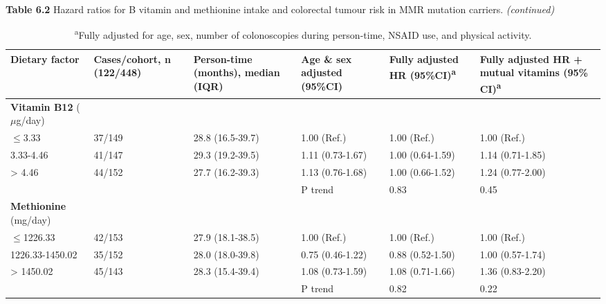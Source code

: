 \begin{sidewaystable}
\caption*{\textbf{Table 6.2} Hazard ratios for B vitamin and methionine intake and colorectal tumour risk in MMR mutation carriers. \emph{(continued)}}
\begin{adjustbox}{width=\textwidth}
\begin{tabular}{L{2.7cm}C{2.5cm}C{3.1cm}C{3.1cm}C{3.1cm}C{3.1cm}}
\hline
\parbox[c][1.7cm]{2.7cm}{\centering \textbf{Dietary factor}} &
\parbox[c][1.7cm]{2.5cm}{\centering \textbf{Cases/cohort, n (122/448)}} &
\parbox[c][1.7cm]{3.1cm}{\centering \textbf{Person-time (months), median (IQR)}} &
\parbox[c][1.7cm]{3.1cm}{\centering \textbf{Age \& sex adjusted (95\%CI)}} &
\parbox[c][1.7cm]{3.1cm}{\centering \textbf{Fully adjusted HR (95\%CI)}{\textsuperscript{a}}} &
\parbox[c][1.7cm]{3.1cm}{\centering \textbf{Fully adjusted HR + mutual vitamins (95\% CI)}{\textsuperscript{a}}}\\
\hline
{\textbf{Vitamin B12}}{ ($\mu$g/day)} & ~ & ~ & ~ & ~ & ~ \\
{\textrm{${\leq}$}}{3.33} & 37/149 & 28.8 (16.5-39.7) & 1.00 (Ref.) & 1.00 (Ref.) & 1.00 (Ref.)\\
3.33-4.46 & 41/147 & 29.3 (19.2-39.5) & 1.11 (0.73-1.67) & 1.00 (0.64-1.59) & 1.14 (0.71-1.85)\\
{\textgreater} 4.46 & 44/152 & 27.7 (16.2-39.3) & 1.13 (0.76-1.68) & 1.00 (0.66-1.52) & 1.24 (0.77-2.00)\\ ~ & ~ & ~ & P trend & 0.83 & 0.45\\

{\textbf{Methionine}}{ (mg/day)} & ~ & ~ & ~ & ~ & ~ \\
{\textrm{${\leq}$}}{1226.33} & 42/153 & 27.9 (18.1-38.5) & 1.00 (Ref.) & 1.00 (Ref.) & 1.00 (Ref.)\\
1226.33-1450.02 & 35/152 & 28.0 (18.0-39.8) & 0.75 (0.46-1.22) & 0.88 (0.52-1.50) & 1.00 (0.57-1.74)\\
{\textgreater} 1450.02 & 45/143 & 28.3 (15.4-39.4) & 1.08 (0.73-1.59) & 1.08 (0.71-1.66) & 1.36 (0.83-2.20)\\ ~ & ~ & ~ & P trend & 0.82 & 0.22\\
\hline
\end{tabular}
\end{adjustbox}
\caption*{\footnotesize{\textsuperscript{a}Fully adjusted for age, sex, number of colonoscopies during person-time, NSAID use, and physical activity.}}
\end{sidewaystable}


